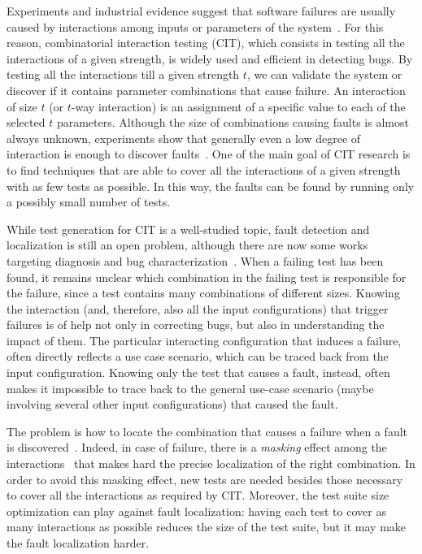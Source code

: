 \documentclass[
12pt, %
oneside, %
english, %
singlespacing, %
headsepline, %
consistentlayout, %
]{MastersDoctoralThesis} %
\theoremstyle{plain}
\theoremstyle{definition}
\theoremstyle{remark}
\theoremstyle{plain}
\theoremstyle{plain}
\theoremstyle{remark}
\begin{document}
Experiments and industrial evidence suggest that software failures are usually caused by interactions among inputs or parameters of the system~\cite{kuhn2002investigation}. For this reason, combinatorial interaction testing (CIT), which consists in testing all the interactions of a given strength, is widely used and efficient in detecting bugs. By testing all the interactions till a given strength $t$, we can validate the system or discover if it contains parameter combinations that cause failure. An interaction of size $t$ (or $t$-way interaction) is an assignment of a specific value to each of the selected $t$ parameters. Although the size of combinations causing faults is almost always unknown, experiments show that generally even a low degree of interaction is enough to discover faults~\cite{kuhncomputer09}. One of the main goal of CIT research is to find techniques that are able to cover all the interactions of a given strength with as few tests as possible. In this way, the faults can be found by running only a possibly small number of tests.

While test generation for CIT is a well-studied topic, fault detection and localization is still an open problem, although there are now some works targeting diagnosis and bug characterization~\cite{satapathy_approaches_2018}. When a failing test has been found, it remains unclear which combination in the failing test is responsible for the failure, since a test contains many combinations of different sizes. Knowing the interaction (and, therefore, also all the input configurations) that trigger failures is of help not only in correcting bugs, but also in understanding the impact of them. The particular interacting configuration that induces a failure, often directly reflects a use case scenario, which can be traced back from the input configuration. Knowing only the test that causes a fault, instead, often makes it impossible to trace back to the general use-case scenario (maybe involving several other input configurations) that caused the fault.

The problem is how to locate the combination that causes a failure when a fault is discovered~\cite{Niu2018Identifying,Niu2018interleaving}. Indeed, in case of failure, there is a \emph{masking} effect among the interactions~\cite{Niu2018Identifying} that makes hard the precise localization of the right combination. In order to avoid this masking effect, new tests are needed besides those necessary to cover all the interactions as required by CIT. Moreover, the test suite size optimization can play against fault localization: having each test to cover as many interactions as possible reduces the size of the test suite, but it may make the fault localization harder.
\end{document}
